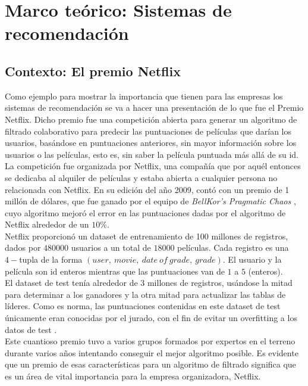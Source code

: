 \chapter{Marco teórico: Sistemas de recomendación}\label{chap:recom}




\section{Contexto: El premio Netflix}

Como ejemplo para mostrar la importancia que tienen para las empresas los sistemas de recomendación se va a hacer una presentación de lo que fue el Premio Netflix. Dicho premio fue una competición abierta para generar un algoritmo de filtrado colaborativo para predecir las puntuaciones de películas que darían los usuarios, basándose en puntuaciones anteriores, sin mayor información sobre los usuarios o las películas, esto es, sin saber la película puntuada más allá de su id.\\

La competición fue organizada por Netflix, una compañía que por aquél entonces se dedicaba al alquiler de películas y estaba abierta a cualquier persona no relacionada con Netflix. En su edición del año 2009, contó con un premio de 1 millón de dólares, que fue ganado por el equipo de \textit{BellKor's Pragmatic Chaos} \cite{netflix}, cuyo algoritmo mejoró el  error en las puntuaciones dadas por el algoritmo de Netflix alrededor de un $10 \%$.\\

Netflix proporcionó un dataset de entrenamiento de 100 millones de registros, dados por $480000$ usuarios a un total de $18000$ películas. Cada registro es una $4-$tupla de la forma $(user,\ movie,\ date\ of\ grade,\ grade)$. El usuario y la película son id enteros mientras que las puntuaciones van de $1$ a $5$ (enteros).\\

El dataset de test tenía alrededor de 3 millones de registros, usándose la mitad para determinar a los ganadores y la otra mitad para actualizar las tablas de líderes. Como es norma, las puntuaciones contenidas en este dataset de test únicamente eran conocidas por el jurado, con el fin de evitar un overfitting a los datos de test \cite{overfitting}.\\

Este cuantioso premio tuvo a varios grupos formados por expertos en el terreno durante varios años intentando conseguir el mejor algoritmo posible. Es evidente que un premio de esas características para un algoritmo de filtrado significa que es un área de vital importancia para la empresa organizadora, Netflix.


